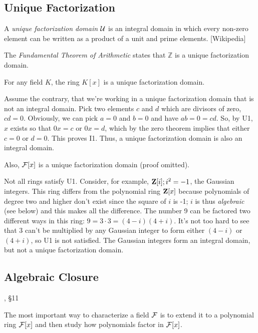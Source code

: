 \subsection*{\qquad Unique Factorization}

\begin{key point}
A {\it unique factorization domain} ${\cal U}$
is an integral domain in which every non-zero element can be written as a product of a unit and prime elements.
[Wikipedia]
\end{key point}


The {\it Fundamental Theorem of Arithmetic} states that ${\mathbb Z}$
is a unique factorization domain.

\theorem

For any field $K$, the ring $K[x]$ is a unique factorization domain.

\proof

Assume the contrary, that we're working in a unique factorization
domain that is not an integral domain.  Pick two elements $c$ and $d$
which are divisors of zero, $cd=0$.  Obviously, we can pick $a=0$ and
$b=0$ and have $ab=0=cd$.  So, by U1, $x$ exists so that $0x=c$ or
$0x=d$, which by the zero theorem implies that either $c=0$ or $d=0$.
This proves I1.  Thus, a unique factorization domain is also an
integral domain.

\endtheorem

Also, ${\cal F}[x]$ is a unique
factorization domain (proof omitted).

Not all rings satisfy U1.  Consider, for example, ${\bf Z}[i];
i^2=-1$, the Gaussian integers.  This ring differs from the polynomial
ring ${\bf Z}[x]$ because polynomials of degree two and higher don't
exist since the square of $i$ is -1; $i$ is thus {\it algebraic} (see
below) and this makes all the difference.  The number 9 can be
factored two different ways in this ring: $9=3\cdot3=(4-i)(4+i)$.
It's not too hard to see that 3 can't be multiplied by any Gaussian
integer to form either $(4-i)$ or $(4+i)$, so U1 is not satisfied.
The Gaussian integers form an integral domain, but not a unique
factorization domain.

\subsection*{\qquad Algebraic Closure}
, \S11

The most important way to characterize a field ${\cal F}$ is to extend
it to a polynomial ring ${\cal F}[x]$ and then study how polynomials
factor in ${\cal F}[x]$.


